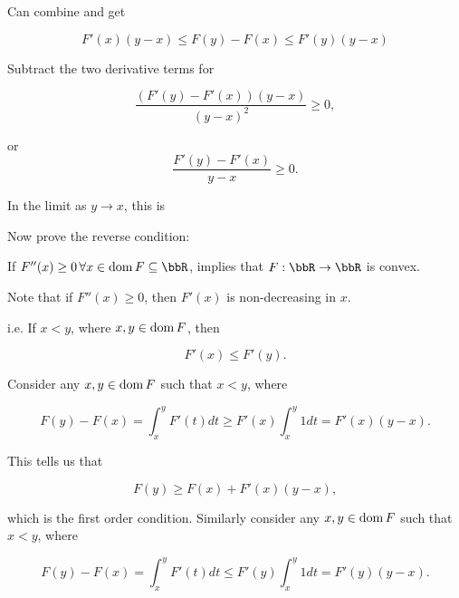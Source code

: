 Can combine and get

\begin{equation}\label{eqn:convexOptimizationLecture6:280}
F'(x) (y-x) \le F(y) - F(x) \le F'(y)(y-x)
\end{equation}

Subtract the two derivative terms for

\begin{dmath}\label{eqn:convexOptimizationLecture6:340}
\frac{(F'(y) - F'(x))(y - x)}{(y - x)^2} \ge 0,
\end{dmath}

or
\begin{dmath}\label{eqn:convexOptimizationLecture6:300}
\frac{F'(y) - F'(x)}{y - x} \ge 0.
\end{dmath}

In the limit as \( y \rightarrow x \), this is

Now prove the reverse condition:

If \( F''(x) \ge 0 \,\forall x \in \dom F \subseteq \bbR \), implies that \( F : \bbR \rightarrow \bbR \) is convex.

Note that if \( F''(x) \ge 0 \), then \( F'(x) \) is non-decreasing in \( x \).

i.e. If \( x < y \), where \( x, y \in \operatorname{dom} F\), then

\begin{dmath}\label{eqn:convexOptimizationLecture6:360}
F'(x) \le F'(y).
\end{dmath}

Consider any \( x,y \in \operatorname{dom} F\) such that \( x < y \), where

\begin{dmath}\label{eqn:convexOptimizationLecture6:380}
F(y) - F(x) = \int_x^y F'(t) dt \ge F'(x) \int_x^y 1 dt = F'(x) (y-x).
\end{dmath}

This tells us that

\begin{dmath}\label{eqn:convexOptimizationLecture6:400}
F(y) \ge F(x) + F'(x)(y - x),
\end{dmath}

which is the first order condition.  Similarly consider any \( x,y \in \operatorname{dom} F\) such that \( x < y \), where

\begin{dmath}\label{eqn:convexOptimizationLecture6:420}
F(y) - F(x) = \int_x^y F'(t) dt \le F'(y) \int_x^y 1 dt = F'(y) (y-x).
\end{dmath}

